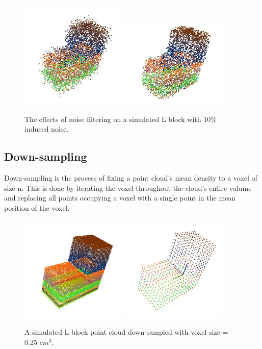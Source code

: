 \documentclass[12pt]{drexelthesis}
\begin{document}
\begin{figure}
\centering
\includegraphics[width=2in]{l_block_pt_cloud10pnoise.jpg} \includegraphics[width=2in]{l_block_pt_cloud10pnoiseFILTEREDk100std05.jpg}
\caption[Effects of noise filter on simulated point cloud objects]{The effects of noise filtering on a simulated L block with 10\% induced noise.}
\end{figure}


\subsection{Down-sampling}
Down-sampling is the process of fixing a point cloud’s mean density to a voxel of size n. This is done by iterating the voxel throughout the cloud’s entire volume and replacing all points occupying a voxel with a single point in the mean position of the voxel.

\begin{figure}
\centering
\includegraphics[width=2in]{l_block_pt_cloud} \includegraphics[width=2in]{l_block_pt_cloudDOWNSAMPLE025.jpg}
\caption[Effects of down-sampling on simulated point cloud objects]{A simulated L block point cloud down-sampled with voxel size = 0.25 $cm^{3}$.}
\end{figure}
\end{document}
